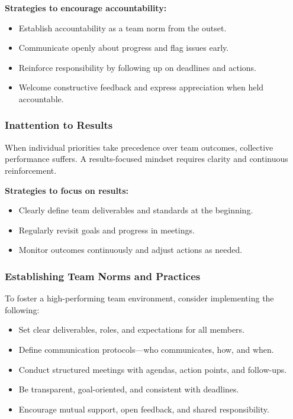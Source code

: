\documentclass{article}
\begin{document}
\vspace{1em}
\textbf{Strategies to encourage accountability:}
\begin{itemize}
    \item Establish accountability as a team norm from the outset.
    \item Communicate openly about progress and flag issues early.
    \item Reinforce responsibility by following up on deadlines and actions.
    \item Welcome constructive feedback and express appreciation when held accountable.
\end{itemize}

\subsubsection{Inattention to Results}

When individual priorities take precedence over team outcomes, collective performance suffers. A results-focused mindset requires clarity and continuous reinforcement.

\vspace{1em}
\textbf{Strategies to focus on results:}
\begin{itemize}
    \item Clearly define team deliverables and standards at the beginning.
    \item Regularly revisit goals and progress in meetings.
    \item Monitor outcomes continuously and adjust actions as needed.
\end{itemize}

\subsubsection{Establishing Team Norms and Practices}

To foster a high-performing team environment, consider implementing the following:

\begin{itemize}
    \item Set clear deliverables, roles, and expectations for all members.
    \item Define communication protocols—who communicates, how, and when.
    \item Conduct structured meetings with agendas, action points, and follow-ups.
    \item Be transparent, goal-oriented, and consistent with deadlines.
    \item Encourage mutual support, open feedback, and shared responsibility.
\end{itemize}
\end{document}
